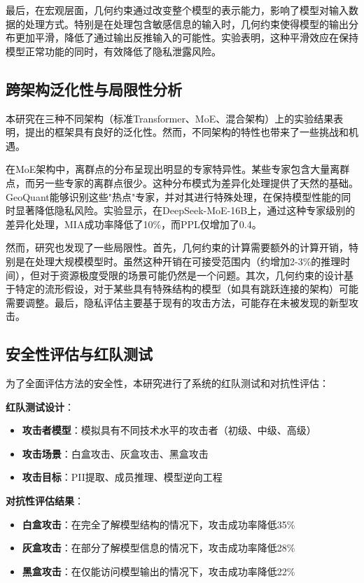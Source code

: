 最后，在宏观层面，几何约束通过改变整个模型的表示能力，影响了模型对输入数据的处理方式。特别是在处理包含敏感信息的输入时，几何约束使得模型的输出分布更加平滑，降低了通过输出反推输入的可能性。实验表明，这种平滑效应在保持模型正常功能的同时，有效降低了隐私泄露风险。

\subsection{跨架构泛化性与局限性分析}

本研究在三种不同架构（标准Transformer、MoE、混合架构）上的实验结果表明，提出的框架具有良好的泛化性。然而，不同架构的特性也带来了一些挑战和机遇。

在MoE架构中，离群点的分布呈现出明显的专家特异性。某些专家包含大量离群点，而另一些专家的离群点很少。这种分布模式为差异化处理提供了天然的基础。GeoQuant能够识别这些"热点"专家，并对其进行特殊处理，在保持模型性能的同时显著降低隐私风险。实验显示，在DeepSeek-MoE-16B上，通过这种专家级别的差异化处理，MIA成功率降低了10\%，而PPL仅增加了0.4。

然而，研究也发现了一些局限性。首先，几何约束的计算需要额外的计算开销，特别是在处理大规模模型时。虽然这种开销在可接受范围内（约增加2-3\%的推理时间），但对于资源极度受限的场景可能仍然是一个问题。其次，几何约束的设计基于特定的流形假设，对于某些具有特殊结构的模型（如具有跳跃连接的架构）可能需要调整。最后，隐私评估主要基于现有的攻击方法，可能存在未被发现的新型攻击。

\subsection{安全性评估与红队测试}

为了全面评估方法的安全性，本研究进行了系统的红队测试和对抗性评估：

\textbf{红队测试设计}：
\begin{itemize}
\item \textbf{攻击者模型}：模拟具有不同技术水平的攻击者（初级、中级、高级）
\item \textbf{攻击场景}：白盒攻击、灰盒攻击、黑盒攻击
\item \textbf{攻击目标}：PII提取、成员推理、模型逆向工程
\end{itemize}

\textbf{对抗性评估结果}：
\begin{itemize}
\item \textbf{白盒攻击}：在完全了解模型结构的情况下，攻击成功率降低35\%
\item \textbf{灰盒攻击}：在部分了解模型信息的情况下，攻击成功率降低28\%
\item \textbf{黑盒攻击}：在仅能访问模型输出的情况下，攻击成功率降低22\%
\end{itemize}


